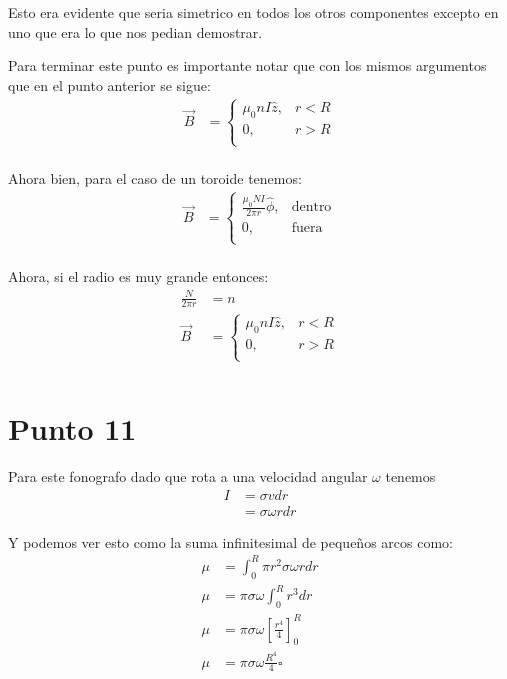 \documentclass{report}
\begin{document}
Esto era evidente que seria simetrico en todos los otros componentes excepto en uno que era lo que nos pedian demostrar.

Para terminar este punto es importante notar que con los mismos argumentos que en el punto anterior se sigue:
\begin{align*}
	\vec{B} &= \begin{cases}
		\mu_0 n I \hat{z}, & r < R\\
		0, & r > R\\
	\end{cases}\\
\end{align*}

Ahora bien, para el caso de un toroide tenemos:
\begin{align*}
	\vec{B} &= \begin{cases}
		\frac{\mu_0 N I}{2\pi r} \hat{\phi}, & \text{dentro}\\
		0, & \text{fuera}\\
	\end{cases}\\
\end{align*}

Ahora, si el radio es muy grande entonces:
\begin{align*}
	\frac{N}{2\pi r} &= n\\
	\vec{B} &= \begin{cases}
		\mu_0 n I \hat{z}, & r < R\\
		0, & r > R\\
	\end{cases}\\
\end{align*}
	

\chapter{Punto 11}

Para este fonografo dado que rota a una velocidad angular $\omega$ tenemos
\begin{align*}
	I &= \sigma v dr\\
	&= \sigma \omega r dr
\end{align*}

Y podemos ver esto como la suma infinitesimal de pequeños arcos como:
\begin{align*}
	\mu &= \int_0^R \pi r^2 \sigma \omega r dr\\
	\mu &= \pi \sigma \omega \int_0^R r^3 dr\\
	\mu &= \pi \sigma \omega \left[ \frac{r^4}{4} \right]_0^R\\
	\mu &= \pi \sigma \omega \frac{R^4}{4} \square
\end{align*}
\end{document}

